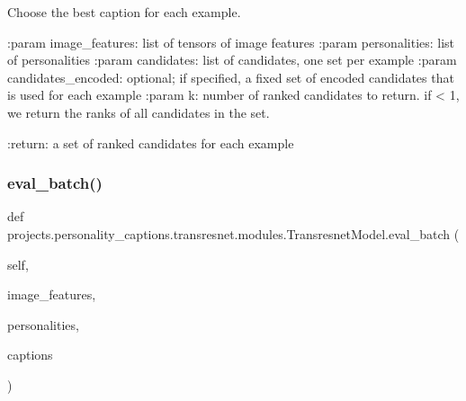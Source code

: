 \begin{DoxyVerb}Choose the best caption for each example.

:param image_features:
    list of tensors of image features
:param personalities:
    list of personalities
:param candidates:
    list of candidates, one set per example
:param candidates_encoded:
    optional; if specified, a fixed set of encoded candidates that is
    used for each example
:param k:
    number of ranked candidates to return. if < 1, we return the ranks
    of all candidates in the set.

:return:
    a set of ranked candidates for each example
\end{DoxyVerb}
 \mbox{\label{classprojects_1_1personality__captions_1_1transresnet_1_1modules_1_1TransresnetModel_a5ae5dc90e1def32a45262dc7705e07a3}} 
\subsubsection{\texorpdfstring{eval\+\_\+batch()}{eval\_batch()}}
{\footnotesize\ttfamily def projects.\+personality\+\_\+captions.\+transresnet.\+modules.\+Transresnet\+Model.\+eval\+\_\+batch (\begin{DoxyParamCaption}\item[{}]{self,  }\item[{}]{image\+\_\+features,  }\item[{}]{personalities,  }\item[{}]{captions }\end{DoxyParamCaption})}

